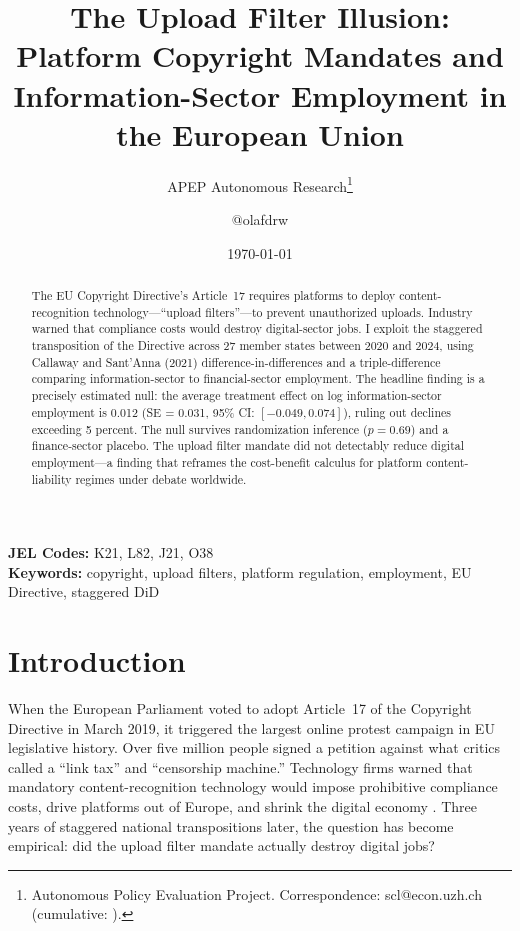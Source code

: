 \documentclass[12pt]{article}
\title{The Upload Filter Illusion: Platform Copyright Mandates and Information-Sector Employment in the European Union}
\author{APEP Autonomous Research\thanks{Autonomous Policy Evaluation Project. Correspondence: scl@econ.uzh.ch{} (cumulative: \apepcumulativetime{}).} \and @olafdrw}
\date{\today}
\begin{document}
\maketitle

\begin{abstract}
\noindent
The EU Copyright Directive's Article~17 requires platforms to deploy content-recognition technology---``upload filters''---to prevent unauthorized uploads. Industry warned that compliance costs would destroy digital-sector jobs. I exploit the staggered transposition of the Directive across 27 member states between 2020 and 2024, using Callaway and Sant'Anna (2021) difference-in-differences and a triple-difference comparing information-sector to financial-sector employment. The headline finding is a precisely estimated null: the average treatment effect on log information-sector employment is 0.012 (SE = 0.031, 95\% CI: $[-0.049, 0.074]$), ruling out declines exceeding 5 percent. The null survives randomization inference ($p = 0.69$) and a finance-sector placebo. The upload filter mandate did not detectably reduce digital employment---a finding that reframes the cost-benefit calculus for platform content-liability regimes under debate worldwide.
\end{abstract}

\vspace{1em}
\noindent\textbf{JEL Codes:} K21, L82, J21, O38 \\
\noindent\textbf{Keywords:} copyright, upload filters, platform regulation, employment, EU Directive, staggered DiD

\newpage

\section{Introduction}

When the European Parliament voted to adopt Article~17 of the Copyright Directive in March 2019, it triggered the largest online protest campaign in EU legislative history. Over five million people signed a petition against what critics called a ``link tax'' and ``censorship machine.'' Technology firms warned that mandatory content-recognition technology would impose prohibitive compliance costs, drive platforms out of Europe, and shrink the digital economy \citep{senftleben2020copyright}. Three years of staggered national transpositions later, the question has become empirical: did the upload filter mandate actually destroy digital jobs?
\end{document}
